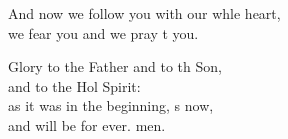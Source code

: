 \begin{psalmverse}
\begin{patverse}
And now we follow you with our whle heart,\Med\\
we fear you and we pray t you.

Glory to the Father and to th Son,\Med\\
    and to the Hol Spirit:\\
as it was in the beginning, \pointup{\i}s now,\Med\\
    and will be for ever. men.
  \end{patverse}
\end{psalmverse}
